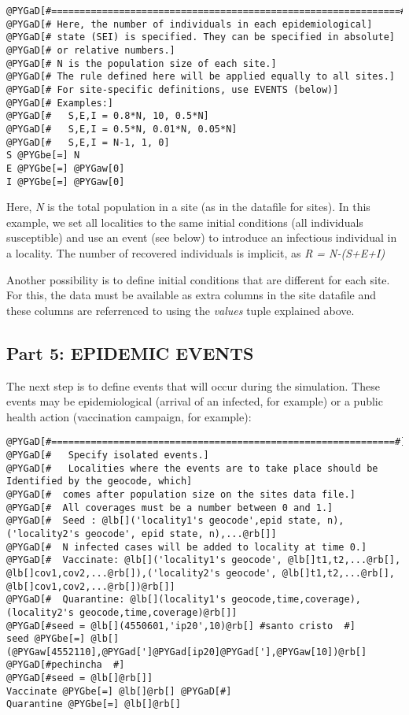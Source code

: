 \documentclass[a4paper,10pt]{manual}
\begin{document}
\begin{Verbatim}[commandchars=@\[\]]
@PYGaD[#==============================================================#]
@PYGaD[# Here, the number of individuals in each epidemiological]
@PYGaD[# state (SEI) is specified. They can be specified in absolute]
@PYGaD[# or relative numbers.]
@PYGaD[# N is the population size of each site.]
@PYGaD[# The rule defined here will be applied equally to all sites.]
@PYGaD[# For site-specific definitions, use EVENTS (below)]
@PYGaD[# Examples:]
@PYGaD[#   S,E,I = 0.8*N, 10, 0.5*N]
@PYGaD[#   S,E,I = 0.5*N, 0.01*N, 0.05*N]
@PYGaD[#   S,E,I = N-1, 1, 0]
S @PYGbe[=] N
E @PYGbe[=] @PYGaw[0]
I @PYGbe[=] @PYGaw[0]
\end{Verbatim}

Here, \emph{N} is the total population in a site (as in the datafile for sites). In this example, we set all localities to the same initial conditions (all individuals susceptible) and use an event (see below) to introduce an infectious individual in a locality. The number of recovered individuals is implicit, as \emph{R = N-(S+E+I)}

Another possibility is to define initial conditions that are different for each site. For this, the data must be available as extra columns in the site datafile and these columns are referrenced to using the \emph{values} tuple explained above.


\subsection{Part 5: EPIDEMIC EVENTS}

The next step is to define events that will occur during the simulation. These events may be epidemiological (arrival of an infected, for example) or a public health action (vaccination campaign, for example):

\begin{Verbatim}[commandchars=@\[\]]
@PYGaD[#=============================================================#]
@PYGaD[#   Specify isolated events.]
@PYGaD[#   Localities where the events are to take place should be Identified by the geocode, which]
@PYGaD[#  comes after population size on the sites data file.]
@PYGaD[#  All coverages must be a number between 0 and 1.]
@PYGaD[#  Seed : @lb[]('locality1's geocode',epid state, n),('locality2's geocode', epid state, n),...@rb[]]
@PYGaD[#  N infected cases will be added to locality at time 0.]
@PYGaD[#  Vaccinate: @lb[]('locality1's geocode', @lb[]t1,t2,...@rb[], @lb[]cov1,cov2,...@rb[]),('locality2's geocode', @lb[]t1,t2,...@rb[], @lb[]cov1,cov2,...@rb[])@rb[]]
@PYGaD[#  Quarantine: @lb[](locality1's geocode,time,coverage), (locality2's geocode,time,coverage)@rb[]]
@PYGaD[#seed = @lb[](4550601,'ip20',10)@rb[] #santo cristo  #]
seed @PYGbe[=] @lb[](@PYGaw[4552110],@PYGad[']@PYGad[ip20]@PYGad['],@PYGaw[10])@rb[] @PYGaD[#pechincha  #]
@PYGaD[#seed = @lb[]@rb[]]
Vaccinate @PYGbe[=] @lb[]@rb[] @PYGaD[#]
Quarantine @PYGbe[=] @lb[]@rb[]
\end{Verbatim}
\end{document}
